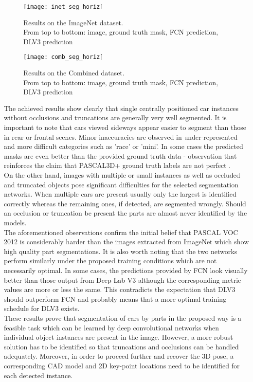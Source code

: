 \documentclass[main.tex]{subfiles}
\begin{document}
\begin{figure}[h]
\centering
\texttt{[image: inet\_seg\_horiz]}
\captionsetup{justification=centering}
\caption{Results on the ImageNet dataset. \\ From top to bottom: image, ground truth mask, FCN prediction, DLV3 prediction}
\label{fig:inet_seg}
\end{figure}
\begin{figure}[h]
\centering
\texttt{[image: comb\_seg\_horiz]}
\captionsetup{justification=centering}
\caption{Results on the Combined dataset. \\ From top to bottom: image, ground truth mask, FCN prediction, DLV3 prediction}
\label{fig:comb_seg}
\end{figure}

\indent The achieved results show clearly that single centrally positioned car instances without occlusions and truncations are generally very well segmented. It is important to note that cars viewed sideways appear easier to segment than those in rear or frontal scenes. Minor inaccuracies are observed in under-represented and more difficult categories such as 'race' or 'mini'. In some cases the predicted masks are even better than the provided ground truth data - observation that reinforces the claim that PASCAL3D+ ground truth labels are not perfect \cite{Grabner2018}.\\
\indent On the other hand, images with multiple or small instances as well as occluded and truncated objects pose significant difficulties for the selected segmentation networks. When multiple cars are present usually only the largest is identified correctly whereas the remaining ones, if detected, are segmented wrongly. Should an occlusion or truncation be present the parts are almost never identified by the models. \\
\indent The aforementioned observations confirm the initial belief that PASCAL VOC 2012 is considerably harder than the images extracted from ImageNet which show high quality part segmentations. It is also worth noting that the two networks perform similarly under the proposed training conditions which are not necessarily optimal. In some cases, the predictions provided by FCN look visually better than those output from Deep Lab V3 although the corresponding metric values are more or less the same. This contradicts the expectation that DLV3 should outperform FCN and probably means that a more optimal training schedule for DLV3 exists.\\
\indent These results prove that segmentation of cars by parts in the proposed way is a feasible task which can be learned by deep convolutional networks when individual object instances are present in the image. However, a more robust solution has to be identified so that truncations and occlusions can be handled adequately. Moreover, in order to proceed further and recover the 3D pose, a corresponding CAD model and 2D key-point locations need to be identified for each detected instance. 
\end{document}
